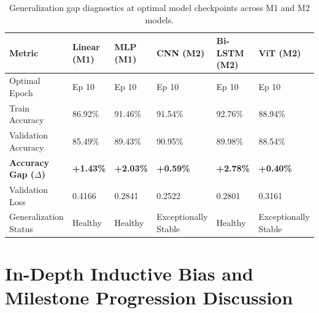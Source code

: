 \documentclass[11pt, a4paper]{article}
\begin{document}
\begin{table}[H]
  \centering
  \caption{Generalization gap diagnostics at optimal model checkpoints across M1 and M2 models.}
  \label{tab:overfitting}
  \small
  \begin{tabularx}{\textwidth}{@{}p{3.5cm} Y Y Y Y Y@{}}
    \toprule
    \textbf{Metric} & \textbf{Linear (M1)} & \textbf{MLP (M1)} & \textbf{CNN (M2)} & \textbf{Bi-LSTM (M2)} & \textbf{ViT (M2)} \\
    \midrule
    Optimal Epoch & Ep 10 & Ep 10 & Ep 10 & Ep 10 & Ep 10 \\
    Train Accuracy & 86.92\% & 91.46\% & 91.54\% & 92.76\% & 88.94\% \\
    Validation Accuracy & 85.49\% & 89.43\% & 90.95\% & 89.98\% & 88.54\% \\
    \textbf{Accuracy Gap ($\Delta$)} & \textbf{+1.43\%} & \textbf{+2.03\%} & \textbf{+0.59\%} & \textbf{+2.78\%} & \textbf{+0.40\%} \\
    Validation Loss & 0.4166 & 0.2841 & 0.2522 & 0.2801 & 0.3161 \\
    Generalization Status & Healthy & Healthy & Exceptionally Stable & Healthy & Exceptionally Stable \\
    \bottomrule
  \end{tabularx}
\end{table}

\section{In-Depth Inductive Bias and Milestone Progression Discussion}
\label{sec:discussion}
\end{document}
